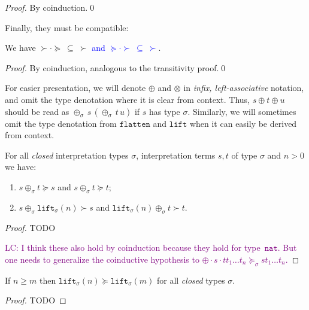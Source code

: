 \documentclass[runningheads,a4paper]{llncs}
\newcommand{\app}[2]{#1 \cdot #2}
\newcommand{\nat}{\mathtt{nat}}
\newcommand{\flatten}{\mathtt{flatten}}
\newcommand{\lift}{\mathtt{lift}}
\newcommand{\CKchange}[1]{\textcolor{blue}{#1}}
\newcommand{\LC}[1]{\textcolor{purple}{LC: #1}}
\begin{document}
\begin{proof}
  By coinduction.\qed
\end{proof}

Finally, they must be compatible:

\begin{lemma}\label{lem:compatibility}
We have $\succ \cdot \succeq\ \subseteq\ \succ$
\CKchange{and $\succeq \cdot \succ\ \subseteq\ \succ$}.
\end{lemma}

\begin{proof}
By coinduction, analogous to the transitivity proof.\qed
\end{proof}

For easier presentation, we will denote $\oplus$ and $\otimes$ in
\emph{infix, left-associative} notation, and omit the type denotation
where it is clear from context.  Thus, $s \oplus t \oplus u$ should be
read as $\oplus_\sigma\,s\,(\oplus_\sigma\,t\,u)$ if $s$ has type
$\sigma$. Similarly, we will sometimes omit the type denotation from
$\flatten$ and $\lift$ when it can easily be derived from context.

\begin{lemma}\label{lem:plusparts}
For all \emph{closed} interpretation types $\sigma$, interpretation
terms $s,t$ of type $\sigma$ and $n > 0$ we have:
\begin{enumerate}
\item $s \oplus_{\sigma} t \succeq s$ and
      $s \oplus_{\sigma} t \succeq t$;
\item $s \oplus_{\sigma} \lift_{\sigma}(n) \succ s$ and
      $\lift_{\sigma}(n) \oplus_{\sigma}  t \succ t$.
\end{enumerate}
\end{lemma}

\begin{proof}
TODO

\LC{I think these also hold by coinduction because they hold for
  type~$\nat$. But one needs to generalize the coinductive hypothesis
  to $\app{\app{\oplus}{s}}{t} t_1 \ldots t_n \succeq_\sigma s t_1
  \ldots t_n$.}

\end{proof}

\begin{lemma}\label{lem:liftgreater}
If $n \geq m$ then $\lift_\sigma(n) \succeq \lift_\sigma(m)$ for all
\emph{closed} types $\sigma$.
\end{lemma}

\begin{proof}
TODO
\end{proof}
\end{document}

